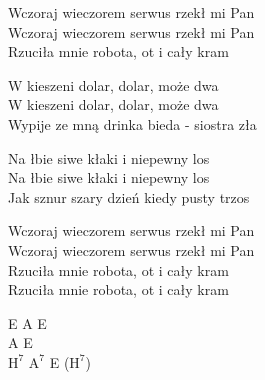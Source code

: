 \begin{text}
    Wczoraj wieczorem serwus rzekł mi Pan\\
    Wczoraj wieczorem serwus rzekł mi Pan\\
    Rzuciła mnie robota, ot i cały kram

    W kieszeni dolar, dolar, może dwa\\
    W kieszeni dolar, dolar, może dwa\\
    Wypije ze mną drinka bieda - siostra zła

    Na łbie siwe kłaki i niepewny los\\
    Na łbie siwe kłaki i niepewny los\\
    Jak sznur szary dzień kiedy pusty trzos

    Wczoraj wieczorem serwus rzekł mi Pan\\
    Wczoraj wieczorem serwus rzekł mi Pan\\
    Rzuciła mnie robota, ot i cały kram\\
    Rzuciła mnie robota, ot i cały kram
\end{text}
\begin{chord}
    E A E\\
    A E\\
    $\mathrm{H^{7}}$ $\mathrm{A^{7}}$ E ($\mathrm{H^{7}}$)
\end{chord}
